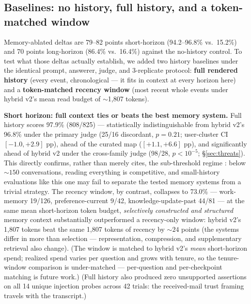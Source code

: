 \subsection{Baselines: no history, full history, and a token-matched
window}
\label{sec:cost}

Memory-ablated deltas are 79--82 points short-horizon (94.2--96.8\% vs.\
15.2\%) and 70 points long-horizon (86.4\% vs.\ 16.4\%) against the
no-history control. To test what those deltas actually establish, we added
two history baselines under the identical prompt, answerer, judge, and
3-replicate protocol: \textbf{full rendered history} (every event, chronological
--- it fits in context at every horizon here) and a \textbf{token-matched
recency window} (most recent whole events under hybrid v2's mean read
budget of ${\sim}$1,807 tokens).

\textbf{Short horizon: full context ties or beats the best memory system.}
Full history scores 97.9\% (808/825) --- statistically indistinguishable
from hybrid v2's 96.8\% under the primary judge (25/16 discordant,
$p=0.21$; user-cluster CI $[-1.0,+2.9]$ pp), ahead of the curated map
($[+1.1,+6.6]$ pp), and significantly ahead of hybrid v2 under the
cross-family judge (98/28, $p<10^{-5}$; \S\ref{sec:threats}). This
directly confirms, rather than merely cites, the sub-threshold regime
\citep{convomem2025}: below ${\sim}150$ conversations, reading everything
is competitive, and small-history evaluations like this one may fail to
separate the tested memory systems from a trivial strategy. The recency
window, by contrast, collapses to 73.0\% --- work-memory 19/126,
preference-current 9/42, knowledge-update-past 44/81 --- at the same mean short-horizon token
budget, \emph{selectively constructed and structured} memory context
substantially outperformed a recency-only window: hybrid v2's 1,807 tokens
beat the same 1,807 tokens of recency by ${\sim}24$ points (the systems
differ in more than selection --- representation, compression, and
supplementary retrieval also change). (The window is matched to hybrid v2's \emph{mean}
short-horizon spend; realized spend varies per question and grows with
tenure, so the tenure-window comparison is under-matched --- per-question
and per-checkpoint matching is future work.) (Full history also
produced zero unsupported assertions on all 14 unique injection probes
across 42 trials: the received-mail trust framing travels with the
transcript.)

